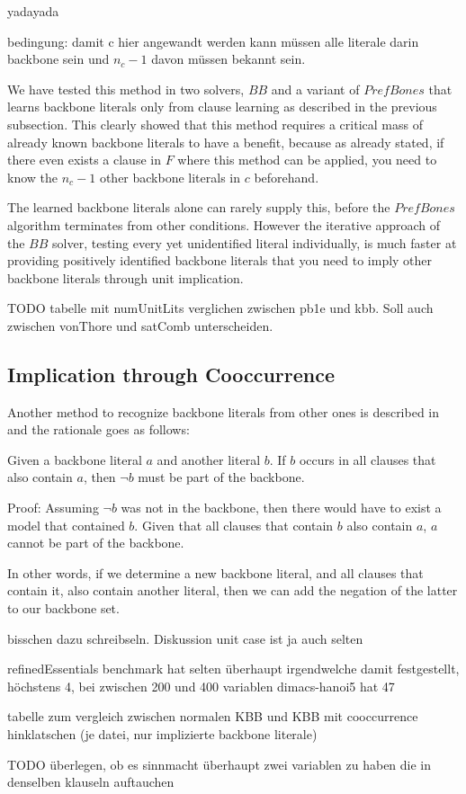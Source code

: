 yadayada

bedingung: damit c hier angewandt werden kann müssen alle literale darin backbone sein und $n_c - 1$ davon müssen bekannt sein.


We have tested this method in two solvers, $BB$ and a variant of $PrefBones$ that learns backbone literals only from clause learning as described in the previous subsection. This clearly showed that this method requires a critical mass of already known backbone literals to have a benefit, because as already stated, if there even exists a clause in $F$ where this method can be applied, you need to know the $n_c - 1$ other backbone literals in $c$ beforehand.

The learned backbone literals alone can rarely supply this, before the $PrefBones$ algorithm terminates from other conditions. However the iterative approach of the $BB$ solver, testing every yet unidentified literal individually, is much faster at providing positively identified backbone literals that you need to imply other backbone literals through unit implication.

TODO tabelle mit numUnitLits verglichen zwischen pb1e und kbb. Soll auch zwischen vonThore und satComb unterscheiden.

\subsection{Implication through Cooccurrence}

Another method to recognize backbone literals from other ones is described in \cite{wbxcl16} and the rationale goes as follows:
\begin{lemma}
Given a backbone literal $a$ and another literal $b$. If $b$ occurs in all clauses that also contain $a$, then $\neg b$ must be part of the backbone. 

Proof: Assuming $\neg b$ was not in the backbone, then there would have to exist a model that contained $b$. Given that all clauses that contain $b$ also contain $a$, $a$ cannot be part of the backbone.
\end{lemma}

In other words, if we determine a new backbone literal, and all clauses that contain it, also contain another literal, then we can add the negation of the latter to our backbone set. 

bisschen dazu schreibseln. Diskussion unit case ist ja auch selten

refinedEssentials benchmark hat selten überhaupt irgendwelche damit festgestellt, höchstens 4, bei zwischen 200 und 400 variablen
dimacs-hanoi5 hat 47

tabelle zum vergleich zwischen normalen KBB und KBB mit cooccurrence hinklatschen (je datei, nur implizierte backbone literale)



TODO überlegen, ob es sinnmacht überhaupt zwei variablen zu haben die in denselben klauseln auftauchen
